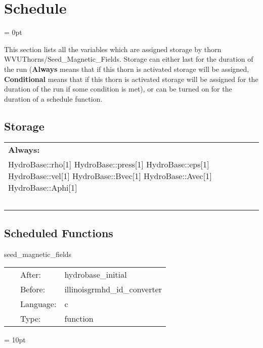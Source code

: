 
\section{Schedule} 


\parskip = 0pt


\noindent This section lists all the variables which are assigned storage by thorn WVUThorns/Seed\_Magnetic\_Fields.  Storage can either last for the duration of the run ({\bf Always} means that if this thorn is activated storage will be assigned, {\bf Conditional} means that if this thorn is activated storage will be assigned for the duration of the run if some condition is met), or can be turned on for the duration of a schedule function.


\subsection*{Storage}

\hspace{5mm}

 \begin{tabular*}{160mm}{ll} 

{\bf Always:}&  ~ \\ 
 HydroBase::rho[1] HydroBase::press[1] HydroBase::eps[1] HydroBase::vel[1] HydroBase::Bvec[1] HydroBase::Avec[1] HydroBase::Aphi[1] & ~\\ 
~ & ~\\ 
\end{tabular*} 


\subsection*{Scheduled Functions}
\vspace{5mm}


\hspace{5mm} seed\_magnetic\_fields 

\hspace{5mm}{\it set up seed magnetic field configuration. } 


\hspace{5mm}

 \begin{tabular*}{160mm}{cll} 
~ & After:  & hydrobase\_initial \\ 
~ & Before:  & illinoisgrmhd\_id\_converter \\ 
~ & Language:  & c \\ 
~ & Type:  & function \\ 
\end{tabular*} 



\vspace{5mm}\parskip = 10pt 
